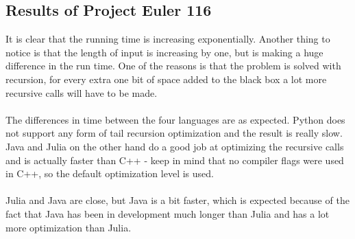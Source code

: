 \documentclass[landscape, a0]{sciposter}
\begin{document}
\begin{multicols}{3}
\begin{figure}
 \hspace*{-7.00cm}
 \begin{subfigure}{0.30\textwidth}
		\centering
 \end{subfigure}
 \hspace*{4.5cm}
 \begin{subfigure}{0.30\textwidth}
		\centering
 \end{subfigure}
\end{figure}

\subsection{Results of Project Euler 116}
It is clear that the running time is increasing exponentially. Another thing to notice is that the length of input is increasing by one, but is making a huge difference in the run time. One of the reasons is that the problem is solved with recursion, for every extra one bit of space added to the black box a lot more recursive calls will have to be made.\\
\\
The differences in time between the four languages are as expected. Python does not support any form of tail recursion optimization and the result is really slow. Java and Julia on the other hand do a good job at optimizing the recursive calls and is actually faster than C++ - keep in mind that no compiler flags were used in C++, so the default optimization level is used.\\
\\
Julia and Java are close, but Java is a bit faster, which is expected because of the fact that Java has been in development much longer than Julia and has a lot more optimization than Julia.


\end{multicols}
\end{document}
